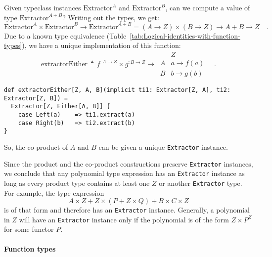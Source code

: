 Given typeclass instances $\text{Extractor}^{A}$ and $\text{Extractor}^{B}$,
can we compute a value of type $\text{Extractor}^{A+B}$? Writing
out the types, we get:
\[
\text{Extractor}^{A}\times\text{Extractor}^{B}\rightarrow\text{Extractor}^{A+B}=\left(A\rightarrow Z\right)\times\left(B\rightarrow Z\right)\rightarrow A+B\rightarrow Z\quad.
\]
Due to a known type equivalence (Table~\ref{tab:Logical-identities-with-function-types}),
we have a unique implementation of this function:
\[
\text{extractorEither}\triangleq f^{:A\rightarrow Z}\times g^{:B\rightarrow Z}\rightarrow\,\begin{array}{|c||c|}
 & Z\\
\hline A & a\rightarrow f(a)\\
B & b\rightarrow g(b)
\end{array}\quad.
\]
\begin{lstlisting}
def extractorEither[Z, A, B](implicit ti1: Extractor[Z, A], ti2: Extractor[Z, B]) =
  Extractor[Z, Either[A, B]] {
    case Left(a)    => ti1.extract(a)
    case Right(b)   => ti2.extract(b)
}
\end{lstlisting}
So, the co-product of $A$ and $B$ can be given a unique \lstinline!Extractor!
instance.

Since the product and the co-product constructions preserve \lstinline!Extractor!
instances, we conclude that any polynomial type expression has an
\lstinline!Extractor! instance as long as every product type contains
at least one $Z$ or another \lstinline!Extractor! type. For example,
the type expression 
\[
A\times Z+Z\times(P+Z\times Q)+B\times C\times Z
\]
is of that form and therefore has an \lstinline!Extractor! instance.
Generally, a polynomial in $Z$ will have an \lstinline!Extractor!
instance only if the polynomial is of the form $Z\times P^{Z}$ for
some functor $P$.

\paragraph{Function types}

